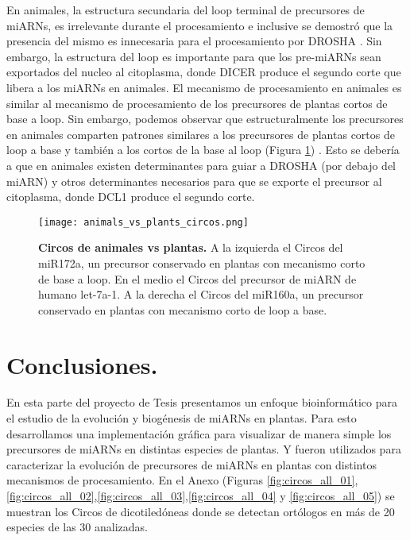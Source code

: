 En animales, la estructura secundaria del loop terminal de precursores de miARNs, es irrelevante durante el procesamiento e inclusive se demostró que la presencia del mismo es innecesaria para el procesamiento por DROSHA \citep{pmid16751099}.
Sin embargo, la estructura del loop es importante para que los pre-miARNs sean exportados del nucleo al citoplasma, donde DICER produce el segundo corte que libera a los miARNs en animales.
El mecanismo de procesamiento en animales es similar al mecanismo de procesamiento de los precursores de plantas cortos de base a loop.
Sin embargo, podemos observar que estructuralmente los precursores en animales comparten patrones similares a los precursores de plantas cortos de loop a base y también a los cortos de la base al loop (Figura \ref{fig:animals_vs_plants_circos}) .
Esto se debería a que en animales existen determinantes para guiar a DROSHA (por debajo del miARN) y otros determinantes necesarios para que se exporte el precursor al citoplasma, donde DCL1 produce el segundo corte.


\begin{landscape} 
\begin{figure}[htbp!] 
        \centering    
        \texttt{[image: animals\_vs\_plants\_circos.png]}
        \caption[Circos de animales vs plantas]{
        \textbf{Circos de animales vs plantas.}
		A la izquierda el Circos del miR172a, un precursor conservado en plantas con mecanismo corto de base a loop.
		En el medio el Circos del precursor de miARN de humano let-7a-1.
		A la derecha el Circos del miR160a, un precursor conservado en plantas con mecanismo corto de loop a base.
        }
	 \label{fig:animals_vs_plants_circos}
    \end{figure}
\end{landscape}


\section{Conclusiones.}
En esta parte del proyecto de Tesis presentamos un enfoque bioinformático para el estudio de la evolución y biogénesis de miARNs en plantas.
Para esto desarrollamos una implementación gráfica para visualizar de manera simple los precursores de miARNs en distintas especies de plantas.
Y fueron utilizados para caracterizar la evolución de precursores de miARNs en plantas con distintos mecanismos de procesamiento.
En el Anexo (Figuras \ref{fig:circos_all_01},\ref{fig:circos_all_02},\ref{fig:circos_all_03},\ref{fig:circos_all_04} y \ref{fig:circos_all_05}) se muestran los Circos de dicotiledóneas donde se detectan ortólogos en más de 20 especies de las 30 analizadas.

